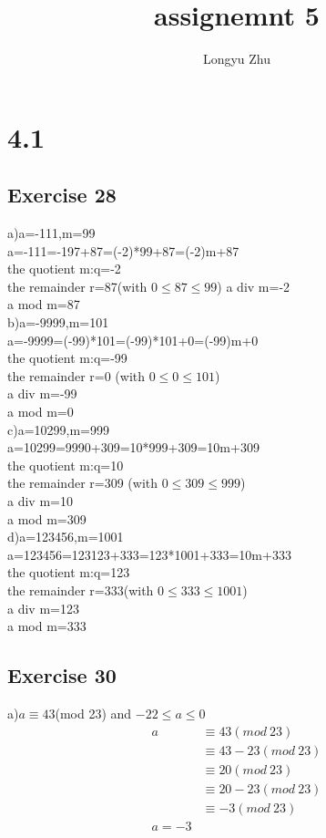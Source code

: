 \documentclass[12pt]{article}
\title{assignemnt 5}
\author{Longyu Zhu}
\begin{document}
\section*{4.1}
\subsection*{Exercise 28}
a)a=-111,m=99\\
a=-111=-197+87=(-2)*99+87=(-2)m+87\\
the quotient m:q=-2\\
the remainder r=87(with $0\leq 87\leq 99$)
a div m=-2\\
a mod m=87\\

b)a=-9999,m=101\\
a=-9999=(-99)*101=(-99)*101+0=(-99)m+0\\
the quotient m:q=-99\\
the remainder r=0 (with $0\leq 0\leq 101$)\\
a div m=-99\\
a mod m=0\\

c)a=10299,m=999\\
a=10299=9990+309=10*999+309=10m+309\\
the quotient m:q=10\\
the remainder r=309 (with $ 0\leq 309\leq 999$)\\
a div m=10\\
a mod m=309\\

d)a=123456,m=1001\\
a=123456=123123+333=123*1001+333=10m+333\\
the quotient m:q=123\\
the remainder r=333(with $0\leq 333\leq 1001$)\\
a div m=123\\
a mod m=333\\

\subsection*{Exercise 30}
a)$a\equiv 43$(mod 23) and $-22\leq a\leq 0$\\
\begin{equation}\nonumber
    \begin{split}
       a&\equiv 43(mod~23)\\
        &\equiv 43-23(mod~23)\\
        &\equiv 20(mod~23)\\
        &\equiv 20-23(mod~23)\\
        &\equiv -3(mod~23)\\
        a=-3
    \end{split}
\end{equation}
\end{document}
